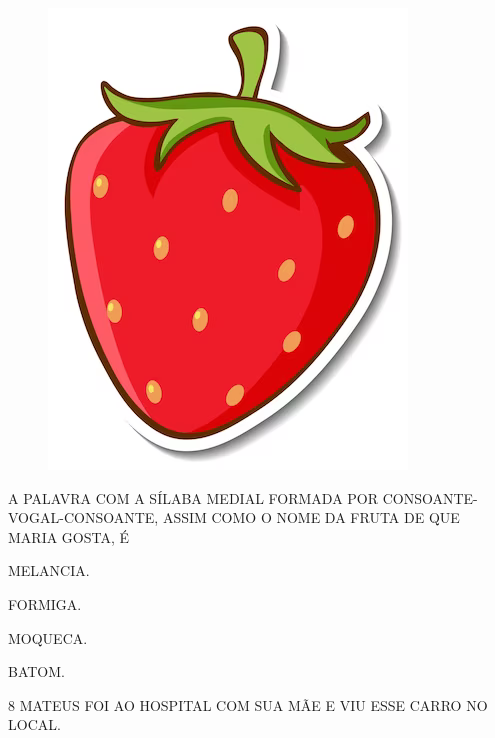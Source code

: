 \begin{figure}[H]
\centering
\includegraphics[width=\textwidth]{./media/image74.png}
\end{figure}

A PALAVRA COM A SÍLABA MEDIAL FORMADA POR CONSOANTE-VOGAL-CONSOANTE, ASSIM COMO O NOME DA FRUTA DE QUE MARIA GOSTA, É 

\begin{escolha}

\item MELANCIA.

\item FORMIGA.

\item MOQUECA.

\item BATOM.

\end{escolha}

\num{8} MATEUS FOI AO HOSPITAL COM SUA MÃE E VIU ESSE CARRO NO LOCAL.

